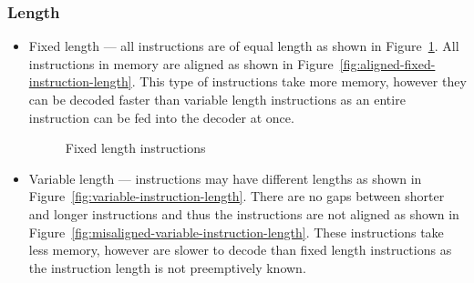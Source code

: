 \documentclass{report}
\begin{document}
\subsubsection{Length}

\begin{itemize}
    \item{Fixed length --- all instructions are of equal length as shown in
        Figure~\ref{fig:fixed-instruction-length}. All instructions in memory
        are aligned as shown in
        Figure~\ref{fig:aligned-fixed-instruction-length}.  This type of
        instructions take more memory, however they can be decoded faster than
        variable length instructions as an entire instruction can be fed into
        the decoder at once.}

    \begin{figure}[H]
    \centering
    \caption{Fixed length instructions}\label{fig:fixed-instruction-length}
    \end{figure}


    \item{Variable length --- instructions may have different lengths as shown
        in Figure~\ref{fig:variable-instruction-length}. There are no gaps
        between shorter and longer instructions and thus the instructions are
        not aligned as shown in
        Figure~\ref{fig:misaligned-variable-instruction-length}. These
        instructions take less memory, however are slower to decode than fixed
        length instructions as the instruction length is not preemptively
        known.}
\end{itemize}
\end{document}
